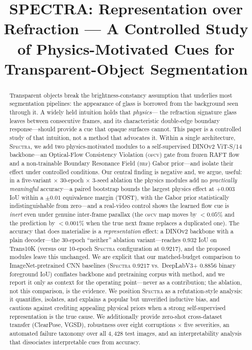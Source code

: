 \documentclass{bmvc2k}
\title{SPECTRA: Representation over Refraction --- A Controlled Study of Physics-Motivated Cues for Transparent-Object Segmentation}
\newcommand{\spectra}{\textsc{Spectra}}
\newcommand{\ofcv}{\textsc{ofcv}}
\newcommand{\brf}{\textsc{brf}}
\newcommand{\dinov}{DINOv2}
\newcommand{\iou}{IoU}
\begin{document}
\maketitle
\begin{abstract}
Transparent objects break the brightness-constancy assumption that underlies
most segmentation pipelines: the appearance of glass is borrowed from the
background seen through it. A widely held intuition holds that \emph{physics}---
the refraction signature glass leaves between consecutive frames, and its
characteristic double-edge boundary response---should provide a cue that opaque
surfaces cannot. This paper is a controlled study of that intuition, not a
method that advocates it. Within a single architecture, \spectra, we add two
physics-motivated modules to a self-supervised \dinov{} ViT-S/14 backbone---an
Optical-Flow Consistency Violation (\ofcv) gate from frozen RAFT flow and a
non-trainable Boundary Resonance Field (\brf) Gabor prior---and isolate their
effect under controlled conditions. Our central finding is negative and, we
argue, useful: in a five-variant $\times$ 30-epoch $\times$ 3-seed ablation the
physics modules add no \emph{practically meaningful} accuracy---a paired
bootstrap bounds the largest physics effect at $+0.003$ \iou{} within a
$\pm0.01$ equivalence margin (TOST), with the Gabor prior statistically
indistinguishable from zero---and a real-video control shows the learned flow
cue is \emph{inert} even under genuine inter-frame parallax (the
\ofcv{} map moves by $<0.05\%$ and the prediction by $<0.001\%$ when the true
next frame replaces a duplicated one). The accuracy that does materialise is a
\emph{representation} effect: a \dinov{} backbone with a plain decoder---the
30-epoch ``neither'' ablation variant---reaches $0.932$ \iou{} on Trans10K
(versus our 10-epoch \spectra{} configuration at $0.9217$), and the proposed
modules leave this unchanged. We are explicit that our matched-budget comparison to
ImageNet-pretrained CNN baselines (\spectra{} $0.9217$ vs.\ DeepLabV3+ $0.8856$
binary foreground \iou) conflates backbone and pretraining corpus with method,
and we report it only as context for the operating point---never as a
contribution; the ablation, not this comparison, is the evidence. We position
\spectra{} as a refutation-style analysis: it quantifies, isolates, and explains
a popular but unverified inductive bias, and cautions against crediting appealing
physical priors when a strong self-supervised representation is the true cause.
We additionally provide zero-shot cross-dataset transfer (ClearPose, VGSD),
robustness over eight corruptions $\times$ five severities, an automated failure
taxonomy over all $4{,}428$ test images, and an interpretability analysis that
dissociates interpretable cues from accuracy.
\end{abstract}
\end{document}
